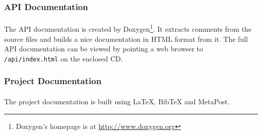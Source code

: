 \subsubsection{API Documentation}
\paragraph{}
The API documentation is created by Doxygen\footnote{Doxygen's homepage is at \href{http://www.doxygen.org}{http://www.doxygen.org}}. It extracts comments from the source files and builds a nice documentation in HTML format from it. The full API documentation can be viewed by pointing a web browser to \texttt{/api/index.html} on the enclosed CD.


\subsubsection{Project Documentation}
\paragraph{}
The project documentation is built using \LaTeX, BibTeX and MetaPost.
